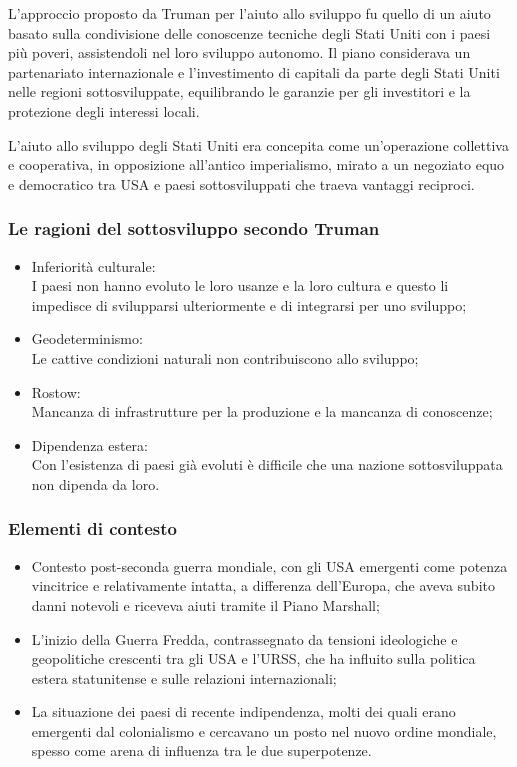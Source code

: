 \documentclass{article}
\begin{document}
L'approccio proposto da Truman per l'aiuto allo sviluppo fu quello di un aiuto basato sulla
condivisione delle conoscenze tecniche degli Stati Uniti con i paesi più poveri, assistendoli
nel loro sviluppo autonomo. Il piano considerava un partenariato internazionale e l'investimento
di capitali da parte degli Stati Uniti nelle regioni sottosviluppate, equilibrando le garanzie
per gli investitori e la protezione degli interessi locali.

L'aiuto allo sviluppo degli Stati Uniti era concepita come un'operazione collettiva e
cooperativa, in opposizione all'antico imperialismo, mirato a un negoziato equo e democratico
tra USA e paesi sottosviluppati che traeva vantaggi reciproci.

\subsubsection{Le ragioni del sottosviluppo secondo Truman}
\begin{itemize}
    \item Inferiorità culturale:\\
        I paesi non hanno evoluto le loro usanze e la loro cultura e questo li impedisce di
        svilupparsi ulteriormente e di integrarsi per uno sviluppo;
    \item Geodeterminismo:\\
        Le cattive condizioni naturali non contribuiscono allo sviluppo;
    \item Rostow:\\
        Mancanza di infrastrutture per la produzione e la mancanza di conoscenze;
    \item Dipendenza estera:\\
        Con l'esistenza di paesi già evoluti è difficile che una nazione sottosviluppata
        non dipenda da loro.
\end{itemize}

\subsubsection{Elementi di contesto}
\begin{itemize}
    \item Contesto post-seconda guerra mondiale, con gli USA emergenti come potenza 
        vincitrice e relativamente intatta, a differenza dell’Europa, che aveva subito danni 
        notevoli e riceveva aiuti tramite il Piano Marshall;
    \item L’inizio della Guerra Fredda, contrassegnato da tensioni ideologiche e geopolitiche 
        crescenti tra gli USA e l’URSS, che ha influito sulla politica estera statunitense e 
        sulle relazioni internazionali;
    \item La situazione dei paesi di recente indipendenza, molti dei quali erano emergenti dal 
        colonialismo e cercavano un posto nel nuovo ordine mondiale, spesso come arena 
        di influenza tra le due superpotenze.
\end{itemize}
\end{document}

